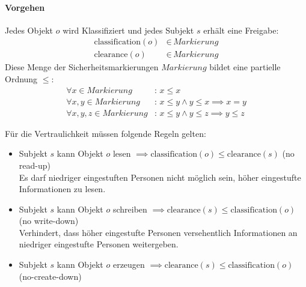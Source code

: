 				\paragraph{Vorgehen}
					Jedes Objekt \(o\) wird Klassifiziert und jedes Subjekt \(s\) erhält eine Freigabe:
					\begin{align*}
						\text{classification}(o) & \in\, \textit{Markierung} \\
						\text{clearance}(o)      & \in\, \textit{Markierung}
					\end{align*}
					Diese Menge der Sicherheitsmarkierungen \(\textit{Markierung}\) bildet eine partielle Ordnung \(\leq\):
					\begin{align*}
						\forall x \in \textit{Markierung}       & :\, x \leq x                                  \\
						\forall x, y \in \textit{Markierung}    & :\, x \leq y \land y \leq x \implies x = y    \\
						\forall x, y, z \in \textit{Markierung} & :\, x \leq y \land y \leq z \implies y \leq z
					\end{align*}

					Für die Vertraulichkeit müssen folgende Regeln gelten:
					\begin{itemize}
						\item Subjekt \(s\) kann Objekt \(o\) lesen     \tabto{6cm} \( \implies \text{classification}(o) \leq \text{clearance}(s) \) (no read-up) \\ Es darf niedriger eingestuften Personen nicht möglich sein, höher eingestufte Informationen zu lesen.
						\item Subjekt \(s\) kann Objekt \(o\) schreiben \tabto{6cm} \( \implies \text{clearance}(s) \leq \text{classification}(o) \) (no write-down) \\ Verhindert, dass höher eingestufte Personen versehentlich Informationen an niedriger eingestufte Personen weitergeben.
						\item Subjekt \(s\) kann Objekt \(o\) erzeugen  \tabto{6cm} \( \implies \text{clearance}(s) \leq \text{classification}(o) \) (no-create-down)
					\end{itemize}

